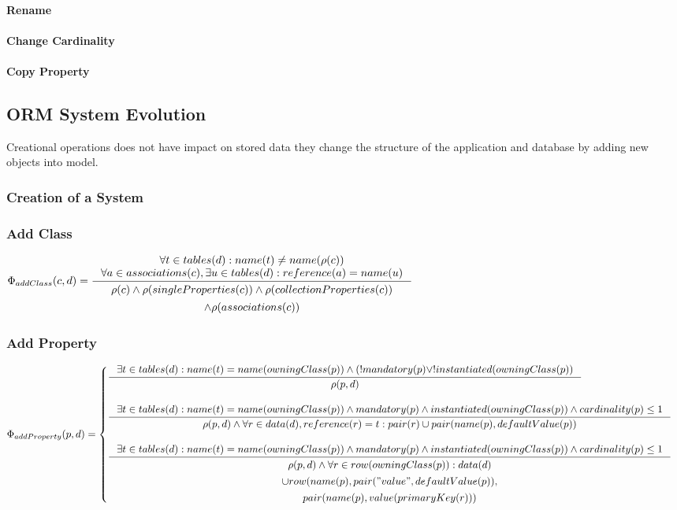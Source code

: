 \documentclass[11pt]{article}
\begin{document}
\paragraph{Rename}
\paragraph{Change Cardinality}
\paragraph{Copy Property}


\subsection{ORM System Evolution}
Creational operations does not have impact on stored data they change the structure of the application and database by adding new objects into model.

\subsubsection{Creation of a System}
\subsubsection{Add Class}

$
\Phi_{addClass}(c, d) = \inference{ \forall t \in tables(d) : name(t) \neq name(\rho(c)) \\
	\forall a \in associations(c), \exists u \in  tables(d) : reference(a) = name(u) 
}{
\begin{gathered}
  \rho(c) \wedge \rho(singleProperties(c)) \wedge \rho(collectionProperties(c)) \\ \wedge \rho(associations(c))
\end{gathered}
}
$
\subsubsection{Add Property}
$
\Phi_{addProperty}(p, d) = \begin{cases}
\inference{ \exists t \in tables(d) : name(t) = name(owningClass(p)) \wedge (! mandatory(p) \vee ! instantiated(owningClass(p))}{ \rho(p,d)} 
\\ \\ 
\inference{ \exists t \in tables(d) : name(t) = name(owningClass(p)) \wedge mandatory(p) \wedge instantiated(owningClass(p)) \wedge cardinality(p) \leq 1}{ \rho(p,d) \wedge \forall r \in data(d), reference(r) = t : pair(r) \cup pair(name(p), defaultValue(p))} 
\\ \\
\inference{ \exists t \in tables(d) : name(t) = name(owningClass(p)) \wedge mandatory(p) \wedge instantiated(owningClass(p)) \wedge cardinality(p) \leq 1}{\begin{gathered}
 \rho(p,d) \wedge \forall r \in row(owningClass(p)) : data(d)\\ \cup row(name(p), pair("value", defaultValue(p)), \\ pair(name(p), value(primaryKey(r))) 
\end{gathered}
} 

\end{cases}
$
\end{document}

